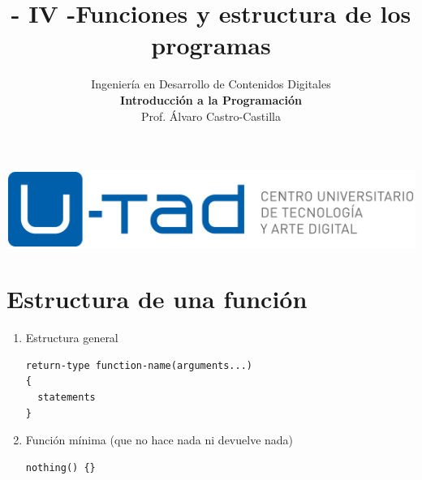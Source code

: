 \documentclass[a4paper,oneside]{article}
\title{- IV -\linebreak Funciones y estructura de los programas}
\author{Ingeniería en Desarrollo de Contenidos Digitales\\ \textbf{Introducción a la Programación}\\ Prof. Álvaro Castro-Castilla}
\date{}
\begin{document}
\maketitle

\begin{center}
\includegraphics[scale=0.3,resolution=300]{images/utad.png}
\end{center}


\section{Estructura de una función}
  \begin{enumerate}
  \item Estructura general

    \begin{verbatim}
return-type function-name(arguments...)
{
  statements
}
    \end{verbatim}

  \item Función mínima (que no hace nada ni devuelve nada)

    \begin{verbatim}
nothing() {}
    \end{verbatim}
  \end{enumerate}
 
\end{document}
